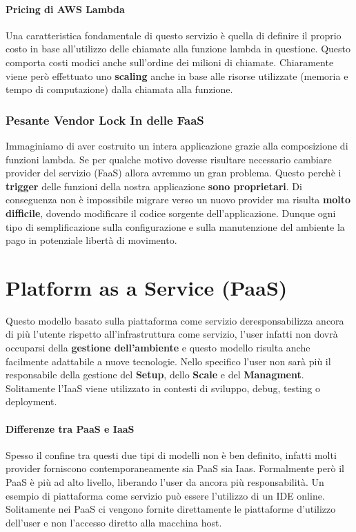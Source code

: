 \documentclass{article}
\begin{document}
\paragraph{Pricing di AWS Lambda} Una caratteristica fondamentale di questo servizio è quella di definire il proprio costo in base all'utilizzo delle chiamate alla funzione lambda in questione. Questo comporta costi modici anche sull'ordine dei milioni di chiamate. Chiaramente viene però effettuato uno \textbf{scaling} anche in base alle risorse utilizzate (memoria e tempo di computazione) dalla chiamata alla funzione.

\subsubsection{Pesante Vendor Lock In delle FaaS}

Immaginiamo di aver costruito un intera applicazione grazie alla composizione di funzioni lambda. Se per qualche motivo dovesse risultare necessario cambiare provider del servizio (FaaS) allora avremmo un gran problema. Questo perchè i \textbf{trigger} delle funzioni della nostra applicazione \textbf{sono proprietari}. Di conseguenza non è impossibile migrare verso un nuovo provider ma risulta \textbf{molto difficile}, dovendo modificare il codice sorgente dell'applicazione. Dunque ogni tipo di semplificazione sulla configurazione e sulla manutenzione del ambiente la pago in potenziale libertà di movimento.

\newpage

\section{Platform as a Service (PaaS)}

Questo modello basato sulla piattaforma come servizio deresponsabilizza ancora di più l'utente
rispetto all'infrastruttura come servizio, l'user infatti non dovrà occuparsi della \textbf{gestione dell'ambiente}
e questo modello risulta anche facilmente adattabile a nuove tecnologie. Nello specifico l'user non sarà più
il responsabile della gestione del \textbf{Setup}, dello \textbf{Scale} e del \textbf{Managment}.
Solitamente l'IaaS viene utilizzato in contesti di sviluppo, debug, testing o deployment.

\paragraph{Differenze tra PaaS e IaaS} Spesso il confine tra questi due tipi di modelli non è ben definito, infatti molti provider forniscono contemporaneamente sia PaaS sia Iaas.
Formalmente però il PaaS è più ad alto livello, liberando l'user da ancora più responsabilità. Un esempio di piattaforma come servizio può essere l'utilizzo di un IDE online. Solitamente nei PaaS ci
vengono fornite direttamente le piattaforme d'utilizzo dell'user e non l'accesso diretto alla macchina host.
\end{document}
